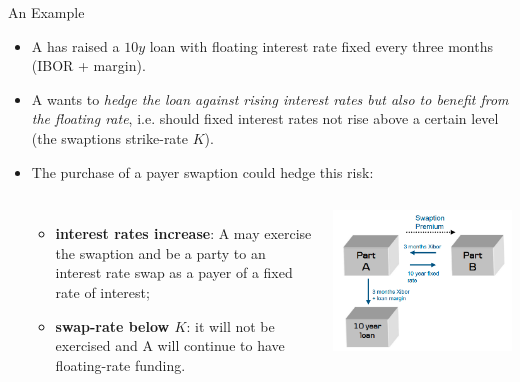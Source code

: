 \documentclass{beamer}
\begin{document}
\begin{frame}{An Example}
	\begin{itemize}
	\item A has raised a $10y$ loan with floating interest rate fixed every three months (IBOR + margin).
	\item A wants to \emph{hedge the loan against rising interest rates but also to benefit from the floating rate}, i.e. should fixed interest rates not rise above a certain level (the swaptions strike-rate $K$).
	\item The purchase of a payer swaption could hedge this risk: 
	\begin{columns}
	\begin{itemize}
		\item \textbf{interest rates increase}: A may exercise the swaption and be a party to an interest rate swap as a payer of a fixed rate of interest;
	\item \textbf{swap-rate below $K$}: it will not be exercised and A will continue to have floating-rate funding.
	\end{itemize}
	\includegraphics[width=1.\linewidth]{swaption_example}
	\end{columns}
\end{itemize}
\end{frame}
\end{document}

